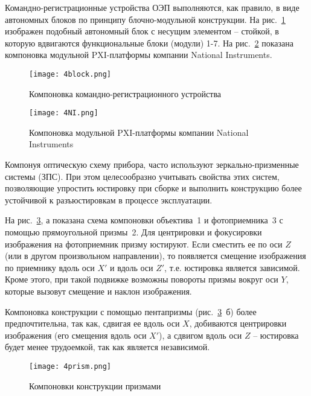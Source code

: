 Командно-регистрационные устройства ОЭП выполняются, как правило, в виде автономных блоков по принципу блочно-модульной конструкции. На рис.~\ref{pic:4block} изображен подобный автономный блок с несущим элементом -- стойкой, в которую вдвигаются функциональные блоки (модули) 1-7. На рис.~\ref{pic:4NI} показана компоновка модульной PXI-платформы компании National Instruments.

\begin{figure}[h!]
	\begin{center}
		\caption{Компоновка командно-регистрационного устройства}
		\texttt{[image: 4block.png]}
		\label{pic:4block}
	\end{center}
\end{figure}

\begin{figure}[h!]
	\begin{center}
		\caption{ Компоновка модульной PXI-платформы компании National Instruments }
		\texttt{[image: 4NI.png]}
		\label{pic:4NI}
	\end{center}
\end{figure}

Компонуя оптическую схему прибора, часто используют зеркально-призменные системы (ЗПС). При этом целесообразно учитывать свойства этих систем, позволяющие упростить юстировку при сборке и выполнить конструкцию более устойчивой к разъюстировкам в процессе эксплуатации.

На рис.~\ref{pic:4prism}, а показана схема компоновки объектива~1 и фотоприемника~3 с помощью прямоугольной призмы~2. Для центрировки и фокусировки изображения на фотоприемник призму юстируют. Если сместить ее по оси $ Z $ (или в другом произвольном направлении), то появляется смещение изображения по приемнику вдоль оси $ X' $ и вдоль оси $ Z' $, т.е. юстировка является зависимой. Кроме этого, при такой подвижке возможны повороты призмы вокруг оси $ Y $, которые вызовут смещение и наклон изображения.

Компоновка конструкции с помощью пентапризмы (рис.~\ref{pic:4prism}~б) более предпочтительна, так как, сдвигая ее вдоль оси $ X $, добиваются центрировки изображения (его смещения вдоль оси $ X' $), а сдвигом вдоль оси $ Z $ -- юстировка будет менее трудоемкой, так как является независимой.

\begin{figure}[h!]
	\begin{center}
		\caption{Компоновки конструкции призмами}
		\texttt{[image: 4prism.png]}
		\label{pic:4prism}
	\end{center}
\end{figure}

